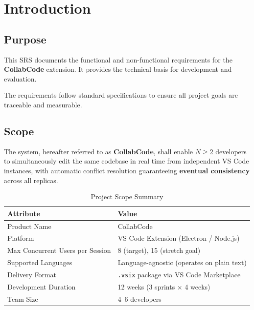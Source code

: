 \documentclass[12pt, a4paper, oneside]{article}
\begin{document}
\tableofcontents
\newpage

\section{Introduction}

\subsection{Purpose}
This SRS documents the functional and non-functional requirements for the \textbf{CollabCode} extension. It provides the technical basis for development and evaluation.

The requirements follow standard specifications to ensure all project goals are traceable and measurable.

\subsection{Scope}
The system, hereafter referred to as \textbf{CollabCode}, shall enable $N \geq 2$ developers to simultaneously edit the same codebase in real time from independent VS Code instances, with automatic conflict resolution guaranteeing \textbf{eventual consistency} across all replicas.

\begin{table}[H]
\centering
\caption{Project Scope Summary}
\begin{tabularx}{\textwidth}{l X}
\toprule
\textbf{Attribute} & \textbf{Value} \\
\midrule
Product Name       & CollabCode \\
Platform           & VS Code Extension (Electron / Node.js) \\
Max Concurrent Users per Session & 8 (target), 15 (stretch goal) \\
Supported Languages & Language-agnostic (operates on plain text) \\
Delivery Format    & \texttt{.vsix} package via VS Code Marketplace \\
Development Duration & 12 weeks (3 sprints $\times$ 4 weeks) \\
Team Size          & 4--6 developers \\
\bottomrule
\end{tabularx}
\end{table}
\end{document}
